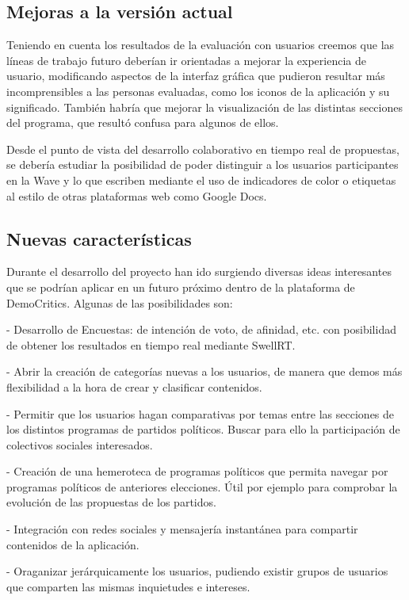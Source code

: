 \subsection{Mejoras a la versión actual}

Teniendo en cuenta los resultados de la evaluación con usuarios creemos que las líneas de trabajo futuro deberían ir orientadas a mejorar la experiencia de usuario, modificando aspectos de la interfaz gráfica que pudieron resultar más incomprensibles a las personas evaluadas, como los iconos de la aplicación y su significado. También habría que mejorar la visualización de las distintas secciones del programa, que resultó confusa para algunos de ellos. 

Desde el punto de vista del desarrollo colaborativo en tiempo real de propuestas, se debería estudiar la posibilidad de poder distinguir a los usuarios participantes en la Wave y lo que escriben mediante el uso de indicadores de color o etiquetas al estilo de otras plataformas web como Google Docs. 

\subsection{Nuevas características}

Durante el desarrollo del proyecto han ido surgiendo diversas ideas interesantes que se podrían aplicar en un futuro próximo dentro de la plataforma de DemoCritics. Algunas de las posibilidades son:

- Desarrollo de Encuestas: de intención de voto, de afinidad, etc. con posibilidad de obtener los resultados en tiempo real mediante SwellRT.

- Abrir la creación de categorías nuevas a los usuarios, de manera que demos más flexibilidad a la hora de crear y clasificar contenidos.

- Permitir que los usuarios hagan comparativas por temas entre las secciones de los distintos programas de partidos políticos. Buscar para ello la participación de colectivos sociales interesados.  

- Creación de una hemeroteca de programas políticos que permita navegar por programas políticos de anteriores elecciones. Útil por ejemplo para comprobar la evolución de las propuestas de los partidos.

- Integración con redes sociales y mensajería instantánea para compartir contenidos de la aplicación.

- Oraganizar jerárquicamente los usuarios, pudiendo existir grupos de usuarios que comparten las mismas inquietudes e intereses.

